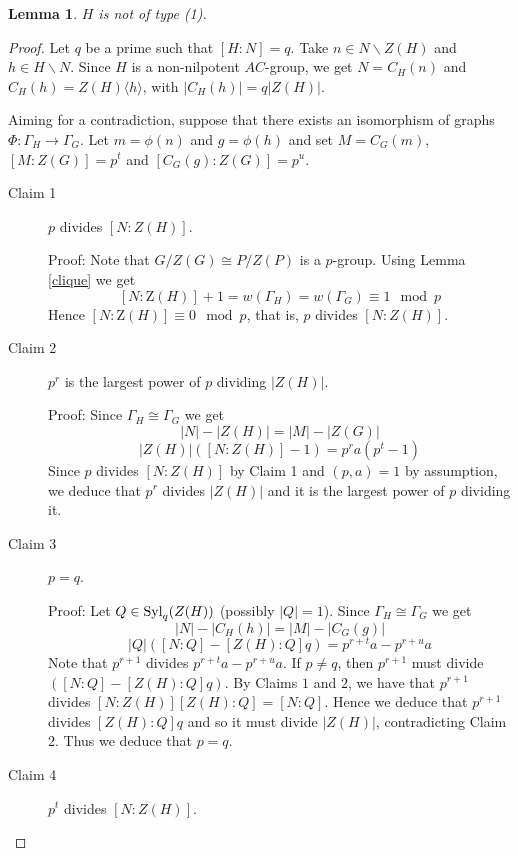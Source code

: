 \documentclass[12pt]{amsart}
\theoremstyle{definition}
\theoremstyle{remark}
\theoremstyle{plain}
\theoremstyle{plain}
\theoremstyle{plain}
\theoremstyle{plain}
\newtheorem{lemma}[definition]{Lemma}
\theoremstyle{plain}
\theoremstyle{remark}
\theoremstyle{remark}
\theoremstyle{definition}
\newcommand{\Syl}{\mathrm{Syl}}
\def \Z {\mathrm {Z}}
\def \Syl {\hbox {\rm Syl}}
\begin{document}
\begin{lemma}\label{type1}
$H$ is not of type (1).
\end{lemma}

\begin{proof}
 Let $q$ be a prime such that $[H \colon N] = q$.
Take $n\in N \backslash Z(H)$ and $h \in H \backslash N$. Since $H$ is a non-nilpotent $AC$-group, we get $N = C_H(n)$ and $C_H(h) = Z(H)\langle h \rangle$, with $|C_H(h)| = q|Z(H)|$.

Aiming for a contradiction, suppose that there exists an isomorphism of graphs $\Phi: \Gamma_H \rightarrow \Gamma_G$. Let $m = \phi(n)$ and $g = \phi(h)$ and set $M= C_G(m)$, $[M \colon Z(G)] = p^t$ and $[ C_G(g) \colon Z(G)] = p^u$. 
\bigskip

\begin{description}
\item[Claim 1] $p$ divides $[N \colon Z(H)]$.

\smallskip
\noindent
Proof: Note that $G/Z(G) \cong P/Z(P)$ is a $p$-group. Using Lemma \ref{clique} we get 
\[[N \colon \Z(H)] +1 = w(\Gamma_H) = w(\Gamma_G)  \equiv 1 \mod p\]
Hence $[N \colon \Z(H)]\equiv 0 \mod p$, that is, $p$ divides  $[N \colon Z(H)]$.

\bigskip
\item[Claim 2] $p^r$ is the largest power of $p$ dividing $|Z(H)|$.

\smallskip
\noindent
Proof: Since $\Gamma_H \cong \Gamma_G$ we get
\[ |N| - |Z(H)| = |M| - |Z(G)| \] 
\[|Z(H)|([N \colon Z(H)] - 1) = p^ra(p^t - 1)\]
Since $p$ divides $[N \colon Z(H)]$ by Claim 1 and $(p,a)=1$ by assumption, we deduce that $p^r$ divides $|Z(H)|$ and it is the largest power of $p$ dividing it.

\bigskip
\item[Claim 3] $p = q$.

\smallskip
\noindent
Proof: Let $Q \in \Syl_q(Z(H))$ (possibly $|Q|=1$). 
Since $\Gamma_H \cong \Gamma_G$ we get
\[ |N| - |C_H(h)| = |M| - |C_G(g)|\]
\[|Q|([N \colon Q] - [Z(H) \colon Q]q) = p^{r+t}a - p^{r+u}a\]
Note that $p^{r+1}$ divides $p^{r+t}a - p^{r+u}a$. If $p\neq q$, then  $p^{r+1}$ must  divide $([N \colon Q] - [Z(H) \colon Q]q)$. By Claims $1$ and $2$, we have that $p^{r+1}$ divides $[N \colon Z(H)][Z(H) \colon Q] = [N\colon Q]$. Hence we deduce that $p^{r+1}$ divides $[Z(H) \colon Q]q$ and so it must divide $|Z(H)|$, contradicting Claim $2$. Thus we deduce that $p=q$. 

\bigskip
\item[Claim 4] $p^t$ divides $[N \colon Z(H)]$.


\end{description}
\end{proof}
\end{document}
